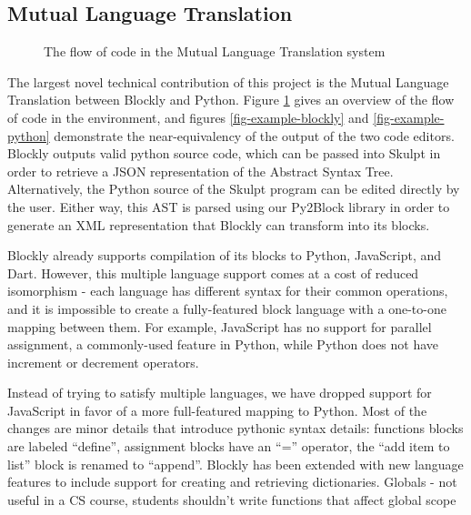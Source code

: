 \documentclass{sig-alternate}
\begin{document}
\subsection{Mutual Language Translation}

\begin{figure}
\label{fig-mlt-overview}
\caption{The flow of code in the Mutual Language Translation system}
\end{figure}

The largest novel technical contribution of this project is the Mutual Language Translation between Blockly and Python.
Figure \ref{fig-mlt-overview} gives an overview of the flow of code in the environment, and figures \ref{fig-example-blockly} and \ref{fig-example-python} demonstrate the near-equivalency of the output of the two code editors.
Blockly outputs valid python source code, which can be passed into Skulpt in order to retrieve a JSON representation of the Abstract Syntax Tree.
Alternatively, the Python source of the Skulpt program can be edited directly by the user. 
Either way, this AST is parsed using our Py2Block library in order to generate an XML representation that Blockly can transform into its blocks.

Blockly already supports compilation of its blocks to Python, JavaScript, and Dart.
However, this multiple language support comes at a cost of reduced isomorphism - each language has different syntax for their common operations, and it is impossible to create a fully-featured block language with a one-to-one mapping between them.
For example, JavaScript has no support for parallel assignment, a commonly-used feature in Python, while Python does not have increment or decrement operators.

Instead of trying to satisfy multiple languages, we have dropped support for JavaScript in favor of a more full-featured mapping to Python.
Most of the changes are minor details that introduce pythonic syntax details: functions blocks are labeled ``define'', assignment blocks have an ``='' operator, the ``add item to list'' block is renamed to ``append''.
Blockly has been extended with new language features to include support for creating and retrieving dictionaries.
Globals - not useful in a CS course, students shouldn't write functions that affect global scope
\end{document}
